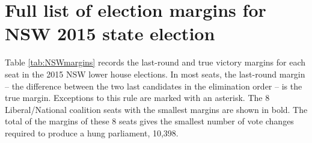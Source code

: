 \documentclass{article}
\begin{document}
\appendix

\section{Full list of election margins for NSW 2015 state election}

Table \ref{tab:NSWmargins} records the last-round and true victory margins for each seat in the 2015 NSW lower house elections. In most seats, the last-round margin -- the difference between the two last candidates in the elimination order -- is the true margin. Exceptions to this rule are marked with an asterisk. The 8 Liberal/National coalition seats with the smallest margins are shown in bold.  The total of the margins of these 8 seats gives the smallest number of vote changes required to produce a hung parliament, 10,398.
\end{document}
